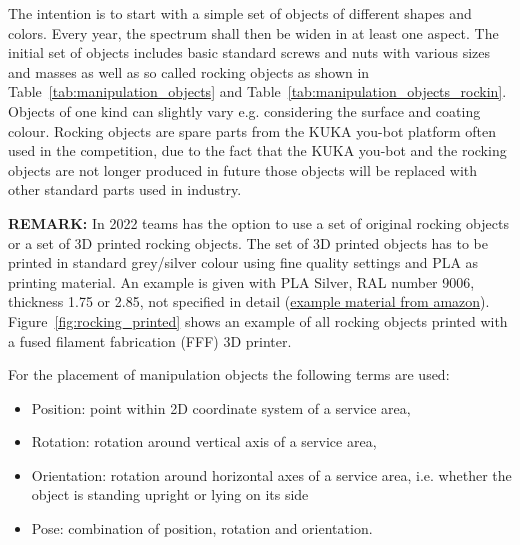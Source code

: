 The intention is to start with a simple set of objects of different shapes and colors. Every year, the spectrum shall then be widen in at least one aspect. 
The initial set of objects includes basic standard screws and nuts with various sizes and masses as well as so called rocking objects as shown in Table~\ref{tab:manipulation_objects} and Table~\ref{tab:manipulation_objects_rockin}. Objects of one kind can slightly vary e.g. considering the surface and coating colour. 
Rocking objects are spare parts from the KUKA you-bot platform often used in the competition, due to the fact that the KUKA you-bot and the rocking objects are not longer produced in future those objects will be replaced with other standard parts used in industry. 

\textbf{REMARK:} In 2022 teams has the option to use a set of original rocking objects or a set of 3D printed rocking objects. The set of 3D printed objects has to be printed in standard grey/silver colour using fine quality settings and PLA as printing material. An example is given with PLA Silver, RAL number 9006, thickness 1.75 or 2.85, not specified in detail (\href{https://www.amazon.de/dp/B07F44HYL6/ref=cm_sw_em_r_mt_dp_T9K6ARS1AHSMBR2B6SPS  }{example material from amazon}). Figure~\ref{fig:rocking_printed} shows an example of all rocking objects printed with a fused filament fabrication (FFF) 3D printer. 

For the placement of manipulation objects the following terms are used:

\begin{itemize}
\item Position: point within 2D coordinate system of a service area,
\item Rotation: rotation around vertical axis of a service area,
\item Orientation: rotation around horizontal axes of a service area, i.e. whether the object is standing upright or lying on its side
\item Pose: combination of position, rotation and orientation.
\end{itemize}

